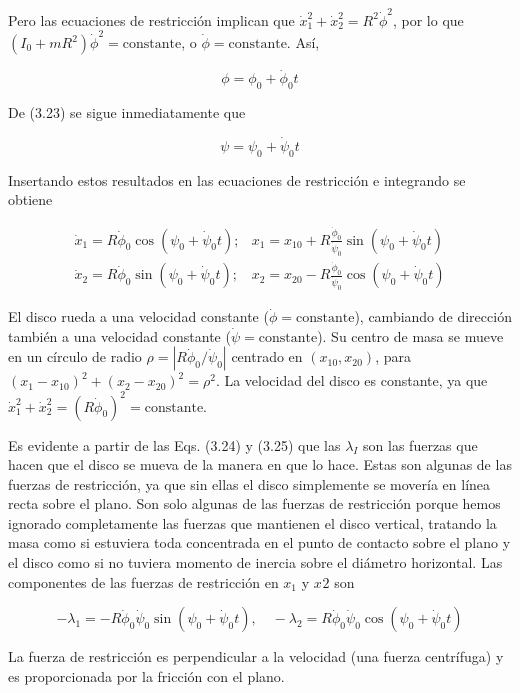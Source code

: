 \begin{example}
Pero las ecuaciones de restricción implican que $\dot{x}_{1}^{2}+\dot{x}_{2}^{2}=R^{2} \dot{\phi}^{2}$, por lo que $(I_{0}+m R^{2}) \dot{\phi}^{2}=\text{constante}$, o $\dot{\phi}=\text{constante}$. Así,

$$
\phi=\phi_{0}+\dot{\phi}_{0} t
$$

De (3.23) se sigue inmediatamente que

$$
\psi=\psi_{0}+\dot{\psi}_{0} t
$$

Insertando estos resultados en las ecuaciones de restricción e integrando se obtiene

$$
\begin{array}{ll}
\dot{x}_{1}=R \dot{\phi}_{0} \cos \left(\psi_{0}+\dot{\psi}_{0} t\right) ; & x_{1}=x_{10}+R \frac{\dot{\phi}_{0}}{\dot{\psi}_{0}} \sin \left(\psi_{0}+\dot{\psi}_{0} t\right) \\
\dot{x}_{2}=R \dot{\phi}_{0} \sin \left(\psi_{0}+\dot{\psi}_{0} t\right) ; & x_{2}=x_{20}-R \frac{\dot{\phi}_{0}}{\dot{\psi}_{0}} \cos \left(\psi_{0}+\dot{\psi}_{0} t\right)
\end{array}
$$

El disco rueda a una velocidad constante ($\dot{\phi}=\text{constante}$), cambiando de dirección también a una velocidad constante ($\dot{\psi}=\text{constante}$). Su centro de masa se mueve en un círculo de radio $\rho=\left|R \dot{\phi}_{0} / \dot{\psi}_{0}\right|$ centrado en $\left(x_{10}, x_{20}\right)$, para $\left(x_{1}-x_{10}\right)^{2}+\left(x_{2}-x_{20}\right)^{2}=\rho^{2}$. La velocidad del disco es constante, ya que $\dot{x}_{1}^{2}+\dot{x}_{2}^{2}=\left(R \dot{\phi}_{0}\right)^{2}=\text{constante}$.

Es evidente a partir de las Eqs. (3.24) y (3.25) que las $\lambda_{I}$ son las fuerzas que hacen que el disco se mueva de la manera en que lo hace. Estas son algunas de las fuerzas de restricción, ya que sin ellas el disco simplemente se movería en línea recta sobre el plano. Son solo algunas de las fuerzas de restricción porque hemos ignorado completamente las fuerzas que mantienen el disco vertical, tratando la masa como si estuviera toda concentrada en el punto de contacto sobre el plano y el disco como si no tuviera momento de inercia sobre el diámetro horizontal. Las componentes de las fuerzas de restricción en $x_{1}$ y $x_{}{2}$ son

$$
-\lambda_{1}=-R \dot{\phi}_{0} \dot{\psi}_{0} \sin \left(\psi_{0}+\dot{\psi}_{0} t\right), \quad-\lambda_{2}=R \dot{\phi}_{0} \dot{\psi}_{0} \cos \left(\psi_{0}+\dot{\psi}_{0} t\right)
$$

La fuerza de restricción es perpendicular a la velocidad (una fuerza centrífuga) y es proporcionada por la fricción con el plano. 

\end{example}


